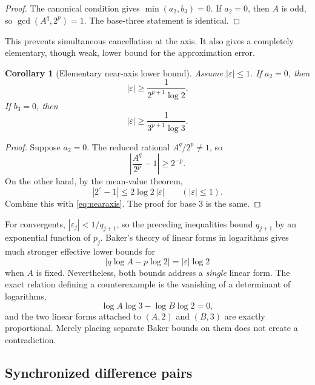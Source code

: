 \documentclass[11pt]{article}
\numberwithin{equation}{section}
\newtheorem{corollary}[theorem]{Corollary}
\theoremstyle{definition}
\begin{document}
\begin{proof}
The canonical condition gives \(\min(a_2,b_3)=0\). If \(a_2=0\), then \(A\) is odd, so \(\gcd(A^q,2^p)=1\). The base-three statement is identical.
\end{proof}

This prevents simultaneous cancellation at the axis. It also gives a completely elementary, though weak, lower bound for the approximation error.

\begin{corollary}[Elementary near-axis lower bound]\label{cor:nearaxisbound}
Assume \(|\varepsilon|\le1\). If \(a_2=0\), then
\begin{equation}\label{eq:eps2bound}
       |\varepsilon|\ge
       \frac{1}{2^{p+1}\log2}.
\end{equation}
If \(b_3=0\), then
\begin{equation}\label{eq:eps3bound}
       |\varepsilon|\ge
       \frac{1}{3^{p+1}\log3}.
\end{equation}
\end{corollary}

\begin{proof}
Suppose \(a_2=0\). The reduced rational \(A^q/2^p\ne1\), so
\[
 \left|\frac{A^q}{2^p}-1\right|\ge2^{-p}.
\]
On the other hand, by the mean-value theorem,
\[
       |2^\varepsilon-1|
       \le 2\log2\,|\varepsilon|
       \qquad (|\varepsilon|\le1).
\]
Combine this with \eqref{eq:nearaxis}. The proof for base \(3\) is the same.
\end{proof}

For convergents, \(|\varepsilon_j|<1/q_{j+1}\), so the preceding inequalities bound \(q_{j+1}\) by an exponential function of \(p_j\). Baker's theory of linear forms in logarithms gives much stronger effective lower bounds for
\[
       |q\log A-p\log2|=|\varepsilon|\log2
\]
when \(A\) is fixed. Nevertheless, both bounds address a \emph{single} linear form. The exact relation defining a counterexample is the vanishing of a determinant of logarithms,
\[
       \log A\log3-\log B\log2=0,
\]
and the two linear forms attached to \((A,2)\) and \((B,3)\) are exactly proportional. Merely placing separate Baker bounds on them does not create a contradiction.

\subsection{Synchronized difference pairs}
\end{document}
